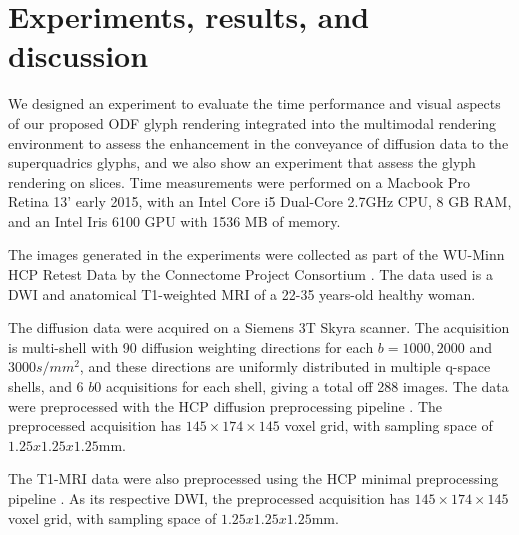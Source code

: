 \documentclass[twoside,twocolumn,10pt]{article}
\begin{document}
\section{Experiments, results, and discussion}
\label{sec::results}


We designed an experiment to evaluate the time performance and visual aspects of our proposed ODF glyph rendering integrated into the multimodal rendering environment to assess the enhancement in the conveyance of diffusion data to the superquadrics glyphs, and we also show an experiment that assess the glyph rendering on slices. Time measurements were performed on a Macbook Pro Retina 13' early 2015, with an Intel Core i5 Dual-Core 2.7GHz CPU, 8 GB RAM, and an Intel Iris 6100 GPU with 1536 MB of memory.

The images generated in the experiments were collected as part of the WU-Minn HCP Retest Data by the Connectome Project Consortium \cite{essen2012}. The data used is a DWI and anatomical T1-weighted MRI of a 22-35 years-old healthy woman.

The diffusion data were acquired on a Siemens 3T Skyra scanner. The acquisition is multi-shell with 90 diffusion weighting directions for each $b = 1000, 2000$ and $3000 s/mm^2$, and these directions are uniformly distributed in multiple q-space shells, and 6 $b0$ acquisitions for each shell, giving a total off 288 images. The data were preprocessed with the HCP diffusion preprocessing pipeline \cite{glasser2013}. The preprocessed acquisition has $145\times 174\times  145$ voxel grid, with sampling space of $1.25x1.25x1.25$mm.


The T1-MRI data were also preprocessed using the HCP minimal preprocessing pipeline \cite{glasser2013}. As its respective DWI, the preprocessed acquisition has $145\times 174\times  145$ voxel grid, with sampling space of $1.25x1.25x1.25$mm.
\end{document}
